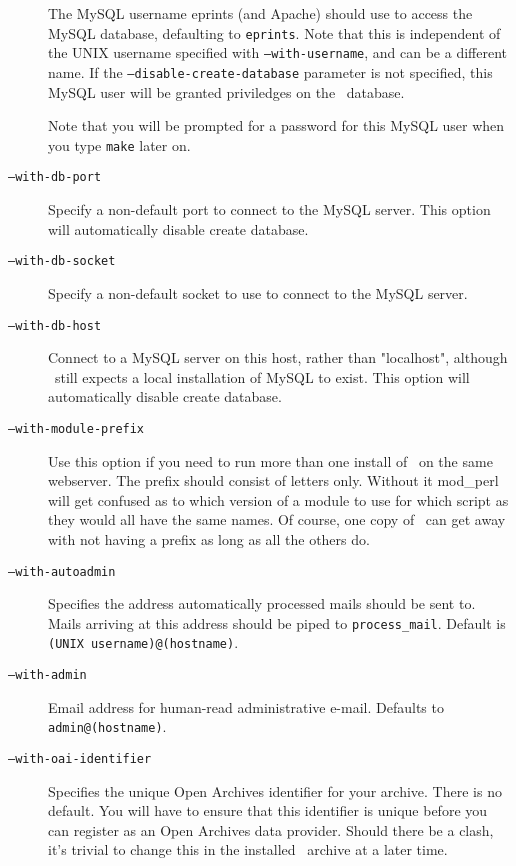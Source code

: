 \begin{description}
The MySQL username eprints (and Apache) should use to access the MySQL database, defaulting to {\tt eprints}. Note that this is independent of the UNIX username specified with {\tt --with-username}, and can be a different name. If the {\tt --disable-create-database} parameter is not specified, this MySQL user will be granted priviledges on the \eprints\ database.

Note that you will be prompted for a password for this MySQL user when you type {\tt make} later on.

\item[{\tt --with-db-port}]

Specify a non-default port to connect to the MySQL server. This option will automatically disable create database.

\item[{\tt --with-db-socket}]

Specify a non-default socket to use to connect to the MySQL server. 

\item[{\tt --with-db-host}]

Connect to a MySQL server on this host, rather than "localhost", although \eprints\ still expects a local installation of
MySQL to exist.  This option will automatically disable create database.

\item[{\tt --with-module-prefix}]

Use this option if you need to run more than one install of \eprints\ on the same webserver. The prefix should consist of letters only. Without it mod\_perl will get confused as to which version of a module to use for which script as they would all have the same names. Of course, one copy of \eprints\ can get away with not having a prefix as long as all the others do.

\item[{\tt --with-autoadmin}]

Specifies the address automatically processed mails should be sent to. Mails arriving at this address should be piped to {\tt process\_mail}. Default is {\tt (UNIX username)@(hostname)}.

\item[{\tt --with-admin}]

Email address for human-read administrative e-mail. Defaults to {\tt admin@(hostname)}.

\item[{\tt --with-oai-identifier}]

Specifies the unique Open Archives identifier for your archive. There is no default. You will have to ensure that this identifier is unique before you can register as an Open Archives data provider. Should there be a clash, it's trivial to change this in the installed \eprints\ archive at a later time.


\end{description}
